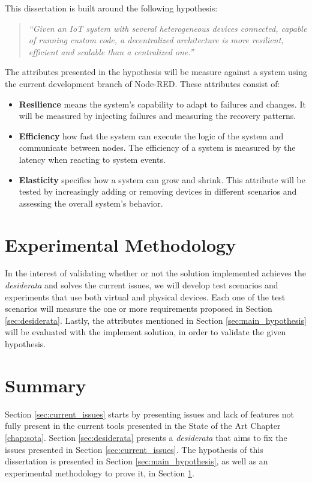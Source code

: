This dissertation is built around the following hypothesis:

\begin{quote}
    \emph{``Given an IoT system with several heterogeneous devices connected, capable of running custom code, a decentralized architecture is more resilient, efficient and scalable than a centralized one.''}
\end{quote}

The attributes presented in the hypothesis will be measure against a system using the current development branch of Node-RED. These attributes consist of:

\begin{itemize}
    \item \textbf{Resilience} means the system's capability to adapt to failures and changes. It will be measured by injecting failures and measuring the recovery patterns.
    \item \textbf{Efficiency} how fast the system can execute the logic of the system and communicate between nodes. The efficiency of a system is measured by the latency when reacting to system events. 
    \item \textbf{Elasticity} specifies how a system can grow and shrink. This attribute will be tested by increasingly adding or removing devices in different scenarios and assessing the overall system's behavior.
\end{itemize}

\section{Experimental Methodology}\label{sec:exp_meth}

In the interest of validating whether or not the solution implemented achieves the \emph{desiderata} and solves the current issues, we will develop test scenarios and experiments that use both virtual and physical devices. Each one of the test scenarios will measure the one or more requirements proposed in Section \ref{sec:desiderata}. Lastly, the attributes mentioned in Section \ref{sec:main_hypothesis} will be evaluated with the implement solution, in order to validate the given hypothesis.

\section{Summary}\label{sec:stat_summary}

Section \ref{sec:current_issues} starts by presenting issues and lack of features not fully present in the current tools presented in the State of the Art Chapter \ref{chap:sota}. Section \ref{sec:desiderata} presents a \textit{desiderata} that aims to fix the issues presented in Section \ref{sec:current_issues}. The hypothesis of this dissertation is presented in Section \ref{sec:main_hypothesis}, as well as an experimental methodology to prove it, in Section \ref{sec:exp_meth}.
